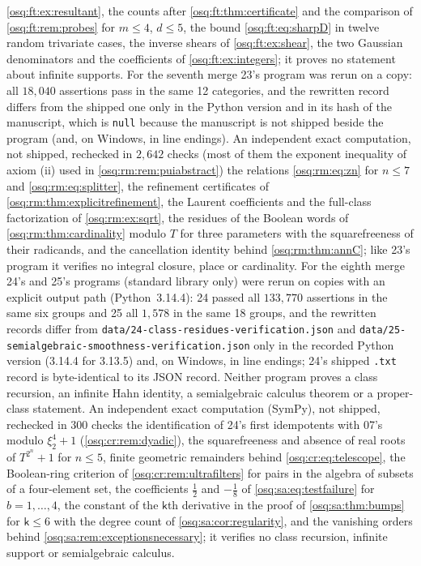 \documentclass[11pt,letterpaper]{article}
\numberwithin{equation}{section}
\theoremstyle{definition}
\theoremstyle{remark}
\theoremstyle{plain}
\begin{document}
\cref{osq:ft:ex:resultant}, the counts after \cref{osq:ft:thm:certificate} and the comparison of \cref{osq:ft:rem:probes} for $m\le4$, $d\le5$, the
bound \eqref{osq:ft:eq:sharpD} in twelve random trivariate cases, the inverse shears of \cref{osq:ft:ex:shear}, the two Gaussian denominators and the
coefficients of \cref{osq:ft:ex:integers}; it proves no statement about infinite supports. For the seventh merge 23's program was rerun on a
copy: all $18{,}040$ assertions pass in the same 12 categories, and the rewritten record differs from the shipped one only in the Python
version and in its hash of the manuscript, which is \texttt{null} because the manuscript is not shipped beside the program (and, on Windows, in
line endings). An independent exact
computation, not shipped, rechecked in $2{,}642$ checks (most of them the exponent inequality of axiom (ii) used in \cref{osq:rm:rem:puiabstract})
the relations \eqref{osq:rm:eq:zn} for $n\le7$ and \eqref{osq:rm:eq:splitter}, the refinement certificates of \cref{osq:rm:thm:explicitrefinement}, the
Laurent coefficients and the full-class factorization of \cref{osq:rm:ex:sqrt}, the residues of the Boolean words of \cref{osq:rm:thm:cardinality} modulo
$T$ for three parameters with the squarefreeness of their radicands, and the cancellation identity behind \cref{osq:rm:thm:annC}; like 23's program it
verifies no integral closure, place or cardinality. For the eighth merge 24's and 25's programs (standard library only) were rerun on copies with an
explicit output path (Python~3.14.4): 24 passed all $133{,}770$ assertions in the same six groups and 25 all $1{,}578$ in the same 18 groups, and the
rewritten records differ from \texttt{data/24-class-residues-verification.json} and \texttt{data/25-semialgebraic-smoothness-verification.json} only in the
recorded Python version (3.14.4 for 3.13.5) and, on Windows, in line endings; 24's shipped \texttt{.txt} record is byte-identical to its JSON record.
Neither program proves a class recursion, an infinite Hahn identity, a semialgebraic calculus theorem or a proper-class statement. An independent exact
computation (SymPy), not shipped, rechecked in $300$ checks the identification of 24's first idempotents with 07's modulo $\xi_2^4+1$
(\cref{osq:cr:rem:dyadic}), the squarefreeness and absence of real roots of $T^{2^n}+1$ for $n\le5$, finite geometric remainders behind
\eqref{osq:cr:eq:telescope}, the Boolean-ring criterion of \cref{osq:cr:rem:ultrafilters} for pairs in the algebra of subsets of a four-element set, the
coefficients $\frac12$ and $-\frac18$ of \eqref{osq:sa:eq:testfailure} for $b=1,\dots,4$, the constant of the $\mathsf k$th derivative in the proof of
\cref{osq:sa:thm:bumps} for $\mathsf k\le6$ with the degree count of \cref{osq:sa:cor:regularity}, and the vanishing orders behind
\cref{osq:sa:rem:exceptionsnecessary}; it verifies no class recursion, infinite support or semialgebraic calculus.
\end{document}
